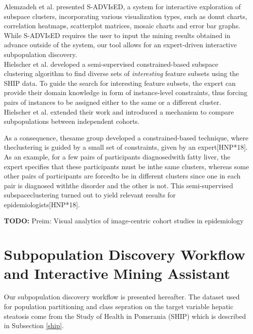 \documentclass[
  oneside]{book}
\begin{document}
Alemzadeh et al. \autocite{eurova.20171118} presented S-ADVIsED, a system for interactive exploration of subspace clusters, incorporating various visualization types, such as donut charts, correlation heatmaps, scatterplot matrices, mosaic charts and error bar graphs.
While S-ADVIsED requires the user to input the mining results obtained in advance outside of the system, our tool allows for an expert-driven interactive subpopulation discovery.\\

Hielscher et al. \autocite{Hielscher16} developed a semi-supervised constrained-based subspace clustering algorithm to find diverse sets of \emph{interesting} feature subsets using the SHIP data.
To guide the search for interesting feature subsets, the expert can provide their domain knowledge in form of instance-level constraints, thus forcing pairs of instances to be assigned either to the same or a different cluster.
Hielscher et al. \autocite{Hielscher2018} extended their work and introduced a mechanism to compare subpopulations between independent cohorts.

As a consequence, thesame group developed a constrained-based technique, where theclustering is guided by a small set of constraints, given by an expert{[}HNP*18{]}. As an example, for a few pairs of participants diagnosedwith fatty liver, the expert specifies that these participants must be inthe same clusters, whereas some other pairs of participants are forcedto be in different clusters since one in each pair is diagnosed withthe disorder and the other is not. This semi-supervised subspaceclustering turned out to yield relevant results for epidemiologists{[}HNP*18{]}.

\textbf{TODO:} Preim: Visual analytics of image-centric cohort studies in epidemiology

\hypertarget{subpopulation-discovery-workflow-and-interactive-mining-assistant}{%
\section{Subpopulation Discovery Workflow and Interactive Mining Assistant}\label{subpopulation-discovery-workflow-and-interactive-mining-assistant}}

Our subpopulation discovery workflow is presented hereafter.
The dataset used for population partitioning and class sepration on the target variable hepatic steatosis come from the Study of Health in Pomerania (SHIP) which is described in Subsection \ref{ship}.
\end{document}
